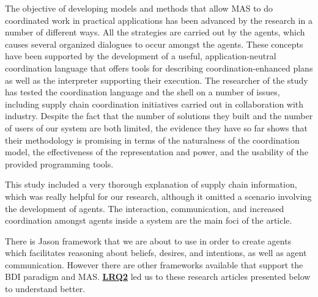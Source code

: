 \begin{itemize}[label={}]
The objective of developing models and methods that allow \ac{MAS} to do coordinated work in practical applications has been advanced by the research in a number of different ways. All the strategies are carried out by the agents, which causes several organized dialogues to occur amongst the agents. These concepts have been supported by the development of a useful, application-neutral coordination language that offers tools for describing coordination-enhanced plans as well as the interpreter supporting their execution. The researcher of the study has tested the coordination language and the shell on a number of issues, including supply chain coordination initiatives carried out in collaboration with industry. Despite the fact that the number of solutions they built and the number of users of our system are both limited, the evidence they have so far shows that their methodology is promising in terms of the naturalness of the coordination model, the effectiveness of the representation and power, and the usability of the provided programming tools.

\vspace{.5cm}
This study included a very thorough explanation of supply chain information, which was really helpful for our research, although it omitted a scenario involving the development of agents. The interaction, communication, and increased coordination amongst agents inside a system are the main foci of the article.
\end{itemize}

\vspace{.5cm}

There is Jason framework that we are about to use in order to create agents which facilitates reasoning about beliefs, desires, and intentions, as well as agent communication. However there are other frameworks available that support the \ac{BDI} paradigm and \ac{MAS}. \hyperref[LRQ2.]{\textbf{LRQ2}} led us to these research articles presented below to understand better.


